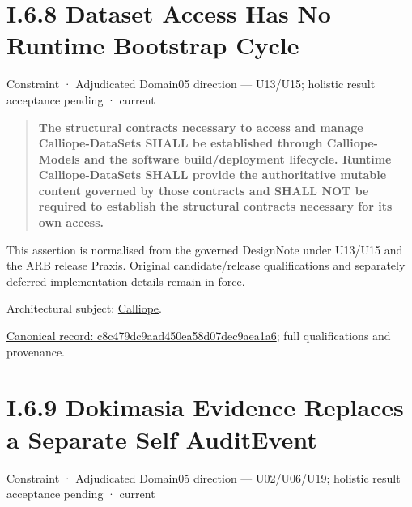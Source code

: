 \section*{I.6.8 Dataset Access Has No Runtime Bootstrap Cycle}
\label{navigation:I.6.8}

\label{element:c8c479dc9aad450ea58d07dec9aea1a6}
{\small Constraint · Adjudicated Domain05 direction — U13/U15; holistic result acceptance pending · current}\par

\begin{quote}


\textbf{The structural contracts necessary to access and manage
Calliope-DataSets SHALL be established through Calliope-Models and the
software build/deployment lifecycle. Runtime Calliope-DataSets SHALL
provide the authoritative mutable content governed by those contracts
and SHALL NOT be required to establish the structural contracts
necessary for its own access.}



\end{quote}


This assertion is normalised from the governed DesignNote under U13/U15 and the ARB release Praxis. Original candidate/release qualifications and separately deferred implementation details remain in force.



Architectural subject: \hyperref[element:466ad8f75a954c0581b5bba090443849]{Calliope}.


{\footnotesize \href{../../../../../../../continuum/motivation/constraint/c8c479dc9aad450ea58d07dec9aea1a6.md}{Canonical record: c8c479dc9aad450ea58d07dec9aea1a6}; full qualifications and provenance.}\par
\section*{I.6.9 Dokimasia Evidence Replaces a Separate Self AuditEvent}
\label{navigation:I.6.9}

\label{element:e1ce978457e543d5894de24e9be9ac2c}
{\small Constraint · Adjudicated Domain05 direction — U02/U06/U19; holistic result acceptance pending · current}\par

